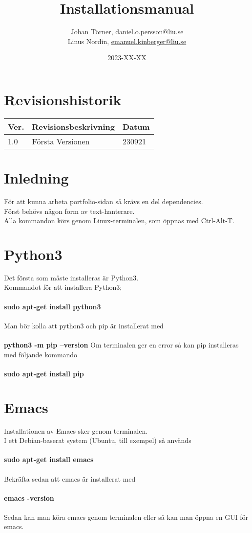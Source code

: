 \documentclass{TDP003mall}
\author{Johan Törner, \url{daniel.o.persson@liu.se}\\
  Linus Nordin, \url{emanuel.kinberger@liu.se}\\}
\title{Installationsmanual}
\date{2023-XX-XX}
\begin{document}
\projectpage
\section{Revisionshistorik}
\begin{table}[!h]
\begin{tabularx}{\linewidth}{|l|X|l|}
\hline
Ver. & Revisionsbeskrivning & Datum \\\hline
1.0 & Första Versionen & 230921 \\\hline
\end{tabularx}
\end{table}


\section{Inledning}
För att kunna arbeta portfolio-sidan så krävs en del dependencies.\\
Först behövs någon form av text-hanterare.\\

Alla kommandon körs genom Linux-terminalen, som öppnas med Ctrl-Alt-T.\\

\section{Python3}
Det första som måste installeras är Python3.\\ 
Kommandot för att installera Python3;\\\\
\textbf{sudo apt-get install python3}\\\\
Man bör kolla att python3 och pip är installerat med\\\\
\textbf{python3 -m pip --version}
Om terminalen ger en error så kan pip installeras med följande kommando\\\\
\textbf{sudo apt-get install pip}

\section{Emacs}
Installationen av Emacs sker genom terminalen.\\
I ett Debian-baserat system (Ubuntu, till exempel) så används\\\\
\textbf{sudo apt-get install emacs}\\\\
Bekräfta sedan att emacs är installerat med\\\\
\textbf{emacs -version}\\\\
Sedan kan man köra emacs genom terminalen eller så kan man öppna en GUI för emacs.
\end{document}

